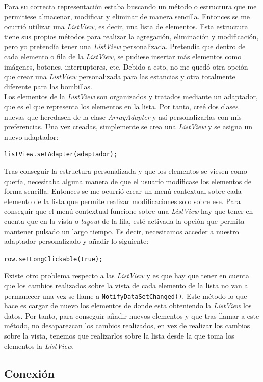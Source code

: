 Para su correcta representación estaba buscando un método o estructura que me permitiese almacenar, modificar y eliminar de manera sencilla. Entonces se me ocurrió utilizar una \textit{ListView}, es decir, una lista de elementos. Esta estructura tiene sus propios métodos para realizar la agregación, eliminación y modificación, pero yo pretendía tener una \textit{ListView} personalizada. Pretendía que dentro de cada elemento o fila de la \textit{ListView}, se pudiese insertar más elementos como imágenes, botones, interruptores, etc. Debido a esto, no me quedó otra opción que crear una \textit{ListView} personalizada para las estancias y otra totalmente diferente para las bombillas. \\
Los elementos de la \textit{ListView} son organizados y tratados mediante un adaptador, que es el que representa los elementos en la lista. Por tanto, creé dos clases nuevas que heredasen de la clase \textit{ArrayAdapter} y así personalizarlas con mis preferencias. Una vez creadas, simplemente se crea una \textit{ListView} y se asigna un nuevo adaptador: 

\verb|listView.setAdapter(adaptador);|

Tras conseguir la estructura personalizada y que los elementos se viesen como quería, necesitaba alguna manera de que el usuario modificase los elementos de forma sencilla. Entonces se me ocurrió crear un menú contextual sobre cada elemento de la lista que permite realizar modificaciones solo sobre ese. Para conseguir que el menú contextual funcione sobre una \textit{ListView} hay que tener en cuenta que en la vista o \textit{layout} de la fila, esté activada la opción que permita mantener pulsado un largo tiempo. Es decir, necesitamos acceder a nuestro adaptador personalizado y añadir lo siguiente:

\verb|row.setLongClickable(true);|

Existe otro problema respecto a las \textit{ListView} y es que hay que tener en cuenta que los cambios realizados sobre la vista de cada elemento de la lista no van a permanecer una vez se llame a \verb|NotifyDataSetChanged()|. Este método lo que hace es cargar de nuevo los elementos de donde esta obteniendo la \textit{ListView} los datos. Por tanto, para conseguir añadir nuevos elementos y que tras llamar a este método, no desaparezcan los cambios realizados, en vez de realizar los cambios sobre la vista, tenemos que realizarlos sobre la lista desde la que toma los elementos la \textit{ListView}.

\subsection{Conexión}

